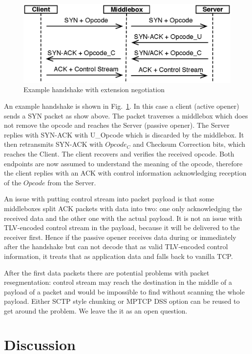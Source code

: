 \documentclass{sig-alternate-10pt}
\begin{document}
\begin{figure}[t!]
\centering
\includegraphics[width=.9\columnwidth]{figs/handshake}
\caption{Example handshake with extension negotiation}
\label{fig:handshake}
\end{figure}

An example handshake is shown in Fig.~\ref{fig:handshake}. In this case a client (active opener) sends a SYN packet as show above. The packet traverses a middlebox which does not remove the opcode and reaches the Server (passive opener). The Server replies with SYN-ACK with U\_Opcode which is discarded by the middlebox. It then retransmits SYN-ACK with $Opcode_C$ and Checksum Correction bits, which reaches the Client. The client recovers and verifies the received opcode. Both endpoints are now assumed to understand the meaning of the opcode, therefore the client replies with an ACK with control information acknowledging reception of the $Opcode$ from the Server.

An issue with putting control stream into packet payload is that some middleboxes split ACK packets with data into two: one only acknowledging the received data and the other one with the actual payload. It is not an issue with TLV-encoded control stream in the payload, because it will be delivered to the receiver first. Hence if the passive opener receives data during or immediately after the handshake but can not decode that as valid TLV-encoded control information, it treats that as application data and falls back to vanilla TCP.

After the first data packets there are potential problems with packet resegmentation: control stream may reach the destination in the middle of a payload of a packet and would be impossible to find without scanning the whole payload. Either SCTP style chunking or MPTCP DSS option can be reused to get around the problem. We leave the it as an open question.

\section{Discussion}
\end{document}
